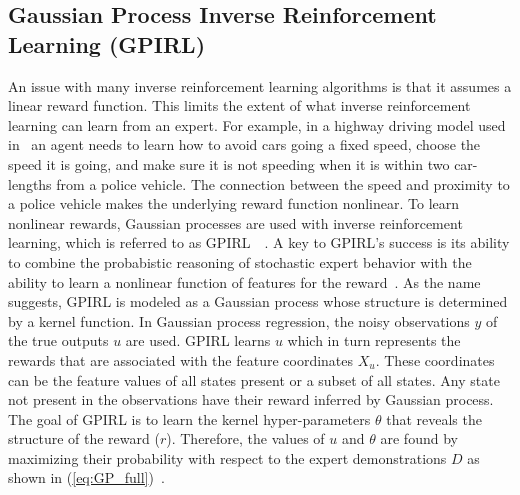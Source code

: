 \documentclass[12pt,american]{report}
\begin{document}
\subsection{Gaussian Process Inverse Reinforcement Learning (GPIRL)}
\label{sec:gpirl}
An issue with many inverse reinforcement learning algorithms is that it assumes a linear reward function.  This limits the extent of what inverse reinforcement learning can learn from an expert.  For example, in a highway driving model used in~\cite{levine2011nonlinear} an agent needs to learn how to avoid cars going a fixed speed, choose the speed it is going, and make sure it is not speeding when it is within two car-lengths from a police vehicle.  The connection between the speed and proximity to a police vehicle makes the underlying reward function nonlinear. To learn nonlinear rewards, Gaussian processes are used with inverse reinforcement learning, which is referred to as GPIRL~\cite{qiao2011inverse}~\cite{levine2011nonlinear}. A key to GPIRL's success is its ability to combine the probabistic reasoning of stochastic expert behavior with the ability to learn a nonlinear function of features for the reward~\cite{levine2011nonlinear}. As the name suggests, GPIRL is modeled as a Gaussian process whose structure is determined by a kernel function. In Gaussian process regression, the noisy observations $y$ of the true outputs $u$ are used.  GPIRL learns $u$ which in turn represents the rewards that are associated with the feature coordinates $X_u$. These coordinates can be the feature values of all states present or a subset of all states. Any state not present in the observations have their reward inferred by Gaussian process.  The goal of GPIRL is to learn the kernel hyper-parameters $\theta$ that reveals the structure of the reward ($r$). Therefore, the values of $u$ and $\theta$ are found by maximizing their probability with respect to the expert demonstrations $D$ as shown in (\ref{eq:GP_full})~\cite{levine2011nonlinear}.
\end{document}
